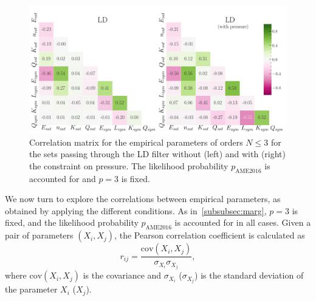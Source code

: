 \begin{figure}[!t]
\begin{center}
  \includegraphics[width=1.0\linewidth]{figures/cm_ld.pdf}
\end{center}
\caption[Correlations among empirical parameters for the sets passing through
the low-density filter]{Correlation matrix for the empirical parameters of 
  orders $N \leq 3$ for the sets passing through the LD filter without (left) 
  and with (right) the constraint on pressure. The likelihood probability 
$p_{\text{AME2016}}$ is accounted for and $p=3$ is fixed.}\label{fig:cm_ld}
\end{figure}
 
We now turn to explore the correlations between empirical parameters, as
obtained by applying the different conditions. As in~\ref{subsubsec:marg},
$p=3$ is fixed, and the likelihood probability $p_{\text{AME2016}}$ is 
accounted for in all cases. 
Given a pair of parameters $(X_i,X_j)$, the Pearson correlation coefficient is 
calculated as 
%
\begin{equation}
  r_{ij} = \frac{\text{cov}(X_i,X_j)}{\sigma_{X_i}\sigma_{X_j}},
\end{equation}
%
where $\text{cov}(X_i,X_j)$ is the covariance and $\sigma_{X_i}$ 
($\sigma_{X_j}$) is the standard deviation of the parameter $X_i$ ($X_j$).

